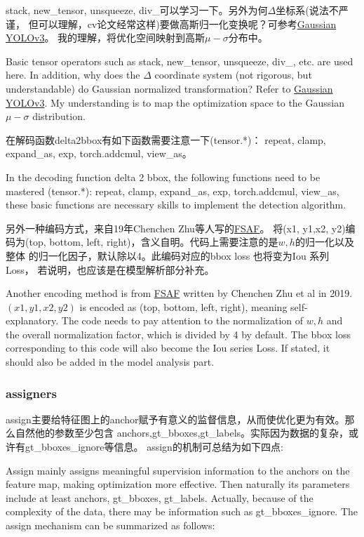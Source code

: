 \documentclass[UTF8]{ctexart}
\begin{document}
stack, new\_tensor, unsqueeze, div\_可以学习一下。另外为何$\Delta$坐标系(说法不严谨，
但可以理解，cv论文经常这样)要做高斯归一化变换呢？可参考\href{https://arxiv.org/abs/1904.04620}{Gaussian YOLOv3}。
我的理解，将优化空间映射到高斯$\mu-\sigma$分布中。

Basic tensor operators such as stack, new\_tensor, unsqueeze, div\_, etc. are used here. In addition, why does 
the $\Delta$ coordinate system (not rigorous, but understandable) do Gaussian normalized transformation? 
Refer to \href{https://arxiv.org/abs/1904.04620}{Gaussian YOLOv3}. My understanding is to map the optimization 
space to the Gaussian $\mu-\sigma$ distribution.

在解码函数delta2bbox有如下函数需要注意一下(tensor.*)：
repeat, clamp, expand\_as, exp, torch.addcmul, view\_as。

In the decoding function delta 2 bbox, the following functions need to be mastered (tensor.*):
repeat, clamp, expand\_as, exp, torch.addcmul, view\_as, these basic functions are necessary skills to implement
the detection algorithm.

另外一种编码方式，来自19年Chenchen Zhu等人写的\href{https://arxiv.org/abs/1903.00621}{FSAF}。
将(x1, y1,x2, y2)编码为(top, bottom, left, right)，含义自明。代码上需要注意的是$w, h$的归一化以及整体
的归一化因子，默认除以4。此编码对应的bbox loss 也将变为Iou 系列 Loss， 若说明，也应该是在模型解析部分补充。

Another encoding method is from \href{https://arxiv.org/abs/1903.00621}{FSAF} written by Chenchen Zhu 
et al in 2019. $(x1, y1, x2, y2)$ is encoded as (top, bottom, left, right), meaning self-explanatory. 
The code needs to pay attention to the normalization of $w, h$ and the overall normalization factor, 
which is divided by 4 by default. The bbox loss corresponding to this code will also become the Iou 
series Loss. If stated, it should also be added in the model analysis part.

\subsubsection{assigners}
assign主要给特征图上的anchor赋予有意义的监督信息，从而使优化更为有效。那么自然他的参数至少包含
anchors,gt\_bboxes,gt\_labels。实际因为数据的复杂，或许有gt\_bboxes\_ignore等信息。
assign的机制可总结为如下四点:

Assign mainly assigns meaningful supervision information to the anchors on the feature map,
 making optimization more effective. Then naturally its parameters include at least anchors, 
 gt\_bboxes, gt\_labels. Actually, because of the complexity of the data, there may be information 
 such as gt\_bboxes\_ignore.
The assign mechanism can be summarized as follows:
\end{document}
